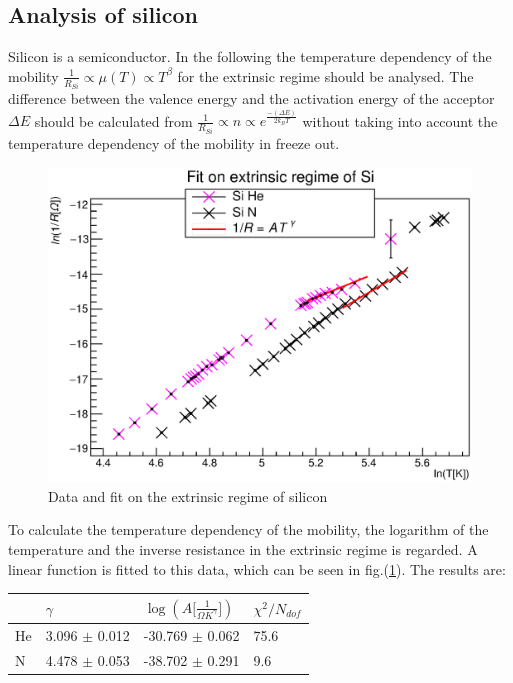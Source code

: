 \documentclass{article}
\begin{document}
\newpage
\subsection{Analysis of silicon}
Silicon is a semiconductor. In the following the temperature dependency of the mobility $ \frac{1}{R_{Si}} \propto \mu(T) \propto T^\beta$ for the extrinsic regime should be analysed. 
The difference between the valence energy and the activation energy of the acceptor $\Delta E$ should be calculated from $\frac{1}{R_{Si}}\propto n \propto e^{\frac{-(\Delta E)}{2k_BT}}$ without taking into account the temperature dependency of the mobility in freeze out.\\
\begin{figure}[H]
    \centering
    \includegraphics[width=\textwidth]{Graphen/Si_doubleLog.eps}
    \caption{Data and fit on the extrinsic regime of silicon}
    \label{mobi}
\end{figure}
To calculate the temperature dependency of the mobility, the logarithm of the temperature and the inverse resistance in the extrinsic regime is regarded. A linear function is fitted to this data, which can be seen in fig.(\ref{mobi}). The results are:
\begin{table}[H]
    \centering
        \begin{tabular}{l|l|l|l}
         & $\gamma$ &  $\log(A[\si{\frac{1}{\Omega K^\gamma}]})$ & $\chi^2/N_{dof}$\\\hline
        He & 3.096 $\pm$ 0.012 & -30.769 $\pm$ 0.062 & 75.6 \\
        N & 4.478 $\pm$ 0.053 & -38.702 $\pm$ 0.291 & 9.6\\
        \end{tabular}
\end{table}
\end{document}
